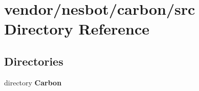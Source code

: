 \section{vendor/nesbot/carbon/src Directory Reference}
\label{dir_92cec68921f95fcc045e5e464267fd82}
\subsection*{Directories}
\begin{DoxyCompactItemize}
\item 
directory {\bf Carbon}
\end{DoxyCompactItemize}
